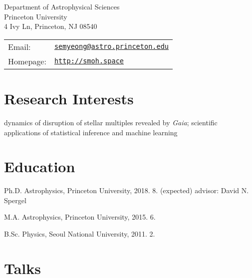 \documentclass[11pt,letterpaper]{article}
\renewenvironment{itemize}{
  \begin{list}{}{
    \setlength{\leftmargin}{1.5em}
  }
}{
  \end{list}
}
\def\name{Semyeong Oh}
\begin{document}

\begin{minipage}{0.45\linewidth}
 Department of Astrophysical Sciences \\
 Princeton University \\
 4 Ivy Ln, Princeton, NJ 08540
\end{minipage}
\begin{minipage}{0.45\linewidth}
 \begin{tabular}{ll}
   Email: & \href{mailto:semyeong@astro.princeton.edu}{\tt semyeong@astro.princeton.edu}\\
   Homepage: & \href{http://smoh.space}{\tt http://smoh.space} \\
 \end{tabular}
\end{minipage}


\section*{Research Interests}

dynamics of disruption of stellar multiples revealed by {\it Gaia};
scientific applications of statistical inference and machine learning

\section*{Education}

\begin{itemize}
  \setlength\itemsep{0.2em}
  \item Ph.D. Astrophysics, Princeton University, 2018. 8. (expected)
    advisor: David N. Spergel

  \item M.A. Astrophysics, Princeton University, 2015. 6.


  \item B.Sc. Physics, Seoul National University, 2011. 2.
\end{itemize}

\section*{Talks}
\end{document}
